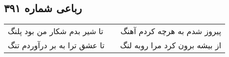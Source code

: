 \begin{center}
\section*{رباعی شماره ۳۹۱}
\label{sec:sh391}
\begin{longtable}{l p{0.5cm} r}
تا شیر بدم شکار من بود پلنگ
&&
پیروز شدم به هرچه کردم آهنگ
\\
تا عشق ترا به بر درآوردم تنگ
&&
از بیشه برون کرد مرا روبه لنگ
\\
\end{longtable}
\end{center}
